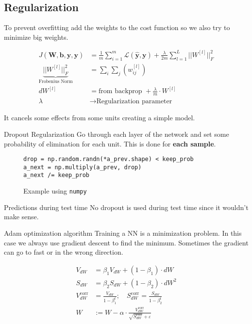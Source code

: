 \subsection{Regularization}
\begin{frame}{\insertsubsec}
    To prevent overfitting add the weights to the cost function so we also try to minimize
    big weights.

    \begin{align*}
        J(\bm{W}, \bm{b}, \hat{\bm{y}}, \bm{y}) &= 
        \frac{1}{m} \sum_{i = 1}^m \mathcal{L}(\hat{\bm{y}}, \bm{y}) + 
        \frac{\lambda}{2m} \sum_{l=1}^L ||W^{[l]}||^2_F \\ 
        \underbrace{||W^{[l]}||^2_F}_{\text{Frobenius Norm}} &= \sum_i \sum_j (w_{ij}^{[l]}) \\ 
        dW^{[l]} &= \text{from backprop } + \frac{\lambda}{m} \cdot W^{[l]} \\
        \lambda &\rightarrow \text{Regularization parameter}
    \end{align*}

    It cancels some effects from some units creating a simple model.
\end{frame}
\begin{frame}[fragile]{Dropout Regularization}
    Go through each layer of the network and set some probability of elimination for each unit. 
    This is done for \textbf{each sample}.

    \begin{figure}
        \begin{verbatim}
drop = np.random.randn(*a_prev.shape) < keep_prob
a_next = np.multiply(a_prev, drop)
a_next /= keep_prob
        \end{verbatim}
        \caption{Example using \texttt{numpy}}
    \end{figure}

    \begin{alertblock}{Predictions during test time}
        No dropout is used during test time since it wouldn't make sense.
    \end{alertblock}
\end{frame}

\begin{frame}{Adam optimization algorithm}
    Training a NN is a minimization problem. In this case we always use gradient descent
    to find the minimum. Sometimes the gradient can go to fast or in the wrong direction.

    \begin{align*}
        V_{dW} &= \beta_1 V_{dW} + (1 - \beta_1) \cdot dW \\
        S_{dW} &= \beta_2 S_{dW} + (1 - \beta_2) \cdot dW^2 \\
        V_{dW}^{\text{corr}} &= \frac{V_{dW}}{1 - \beta_1^t}; \quad
        S_{dW}^{\text{corr}} = \frac{S_{dW}}{1 - \beta_2^t} \\
        W &:= W - \alpha \cdot \frac{V_{dW}^{\text{corr}}}
        {\sqrt{S_{dW}^{\text{corr}}} + \varepsilon}
    \end{align*}
\end{frame}

